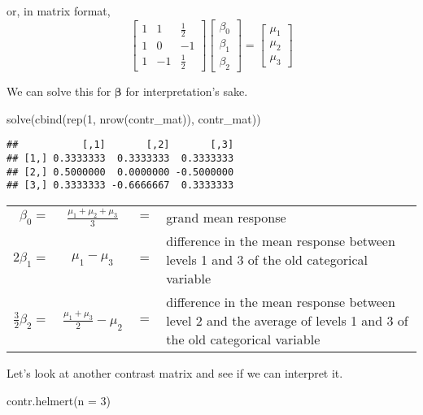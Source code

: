 \documentclass[
]{book}
\newenvironment{Shaded}{\begin{snugshade}}{\end{snugshade}}
\newcommand{\AttributeTok}[1]{\textcolor[rgb]{0.77,0.63,0.00}{#1}}
\newcommand{\DecValTok}[1]{\textcolor[rgb]{0.00,0.00,0.81}{#1}}
\newcommand{\FunctionTok}[1]{\textcolor[rgb]{0.00,0.00,0.00}{#1}}
\newcommand{\NormalTok}[1]{#1}
\begin{document}
or, in matrix format,
\[
\begin{bmatrix}
1 & 1 & \tfrac{1}{2} \\
1 & 0 & -1 \\
1 & -1 & \tfrac{1}{2}
\end{bmatrix}
\begin{bmatrix}
\beta_0 \\
\beta_1  \\
\beta_2 
\end{bmatrix}
=
\begin{bmatrix}
\mu_1 \\
\mu_2  \\
\mu_3 
\end{bmatrix}
\]

We can solve this for \(\boldsymbol{\beta}\) for interpretation's sake.

\begin{Shaded}
\begin{Highlighting}[]
\FunctionTok{solve}\NormalTok{(}\FunctionTok{cbind}\NormalTok{(}\FunctionTok{rep}\NormalTok{(}\DecValTok{1}\NormalTok{, }\FunctionTok{nrow}\NormalTok{(contr\_mat)), contr\_mat))}
\end{Highlighting}
\end{Shaded}

\begin{verbatim}
##           [,1]       [,2]       [,3]
## [1,] 0.3333333  0.3333333  0.3333333
## [2,] 0.5000000  0.0000000 -0.5000000
## [3,] 0.3333333 -0.6666667  0.3333333
\end{verbatim}

\begin{tabularx}{\textwidth}{r c c X}
\(\beta_0 =\) &\(\tfrac{\mu_1+\mu_2+\mu_3}{3}\) &\(=\) &grand mean response \\
\(2\beta_1 =\) &\(\mu_1 - \mu_3\) &\(=\) &difference in the mean response between levels 1 and 3 of the old categorical variable \\
\(\tfrac{3}{2}\beta_2 =\) &\(\tfrac{\mu_1+\mu_3}{2} - \mu_2\) &\(=\) &difference in the mean response between level 2 and the average of levels 1 and 3 of the old categorical variable
\end{tabularx}

Let's look at another contrast matrix and see if we can interpret it.

\begin{Shaded}
\begin{Highlighting}[]
\FunctionTok{contr.helmert}\NormalTok{(}\AttributeTok{n =} \DecValTok{3}\NormalTok{)}
\end{Highlighting}
\end{Shaded}
\end{document}

